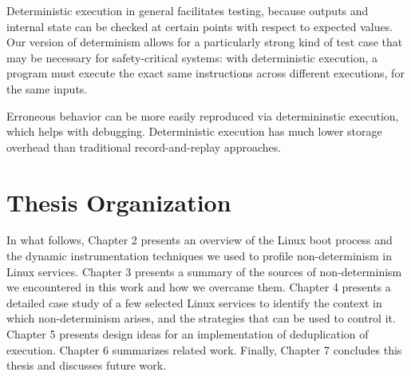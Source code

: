 Deterministic execution in general facilitates testing,
because outputs and internal state can be checked at 
certain points with respect to expected values. Our version
of determinism allows for a particularly strong kind
of test case that may be necessary for safety-critical 
systems: with deterministic execution, a program 
must execute the exact same instructions 
across different executions, for the same inputs. \newline 

Erroneous behavior can be more easily reproduced
via determininstic execution, which
helps with debugging. Deterministic
execution has much lower storage overhead
than traditional record-and-replay approaches. 

\section{Thesis Organization} 
In what follows, Chapter 2 presents an overview of
the Linux boot process and the dynamic instrumentation
techniques we used to profile non-determinism in Linux services.
Chapter 3 presents a summary of the sources of non-determinism
we encountered in this work and how we overcame them. 
Chapter 4 presents a detailed case study of a few selected Linux services
to identify the context in which non-determinism arises,
and the strategies that can be used to control it.
Chapter 5 presents design ideas for an implementation of deduplication of execution.
Chapter 6 summarizes related work. Finally, Chapter 7 concludes this thesis
and discusses future work.

%

%

